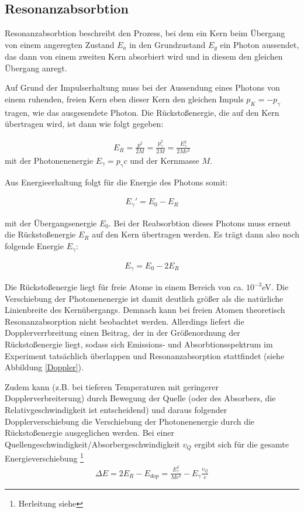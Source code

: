 \subsection{Resonanzabsorbtion}

Resonanzabsorbtion beschreibt den Prozess, bei dem ein Kern beim Übergang von einem angeregten Zustand  $E_a$ in den Grundzustand $E_g$ ein Photon aussendet, das dann von einem zweiten Kern absorbiert wird und in diesem den gleichen Übergang anregt. 

Auf Grund der Impulserhaltung muss bei der Aussendung eines Photons von einem ruhenden, freien Kern eben dieser Kern den gleichen Impuls  $p_K = -p_{\gamma}$ tragen, wie das ausgesendete Photon. Die Rückstoßenergie, die auf den Kern übertragen wird, ist dann wie folgt gegeben:

\begin{align}
E_R = \frac{p^2}{2M} = \frac{p_{\gamma}^2}{2M} = \frac{E_{\gamma}^2}{2Mc^2} \label{5}
\end{align}
 mit der Photonenenergie $E_{\gamma}=p_{\gamma}c$ und der Kernmasse $M$.

Aus Energieerhaltung folgt für die Energie des Photons somit:

\begin{align}
E_{\gamma}' = E_0 - E_R
\end{align}

mit der Übergangsenergie $E_0$. Bei der Reabsorbtion dieses Photons muss erneut die Rückstoßenergie $E_R$  auf den Kern übertragen werden. Es trägt dann also noch folgende Energie $E_{\gamma}$:

\begin{align}
E_{\gamma} = E_0-2E_R
\end{align}

Die Rückstoßenergie liegt für freie Atome in einem Bereich von ca.  $10^{-3}$eV. Die Verschiebung der Photonenenergie ist damit deutlich größer als die natürliche Linienbreite des Kernübergangs. Demnach kann bei freien Atomen theoretisch Resonanzabsorption nicht beobachtet werden. Allerdings liefert die Dopplerverrbreitung einen Beitrag, der in der Größenordnung der Rückstoßenergie liegt, sodass sich Emissions- und Absorbtionsspektrum im Experiment tatsächlich überlappen und Resonanzabsorption stattfindet (siehe Abbildung \ref{Doppler}).

Zudem kann (z.B. bei tieferen Temperaturen mit geringerer Dopplerverbreiterung) durch Bewegung der Quelle (oder des Absorbers, die Relativgeschwindigkeit ist entscheidend) und daraus folgender Dopplerverschiebung die Verschiebung der Photonenenergie durch die Rückstoßenergie ausgeglichen werden.
Bei einer Quellengeschwindigkeit/Absorbergeschwindigkeit $v_Q$ ergibt sich für die gesamte Energieverschiebung \footnote{Herleitung siehe} %
\begin{align}
\Delta E = 2E_R - E_{dop} = \frac{E_{\gamma}^2}{Mc^2} - E_{\gamma}\frac{v_Q}{c}
\end{align}

